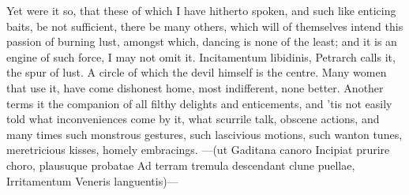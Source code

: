 Yet were it so, that these of which I have hitherto spoken, and such
like enticing baits, be not sufficient, there be many others, which
will of themselves intend this passion of burning lust, amongst which,
dancing is none of the least; and it is an engine of such force, I may
not omit it. Incitamentum libidinis, Petrarch calls it, the spur of
lust. A  circle of which the devil himself is the centre.
Many women that use it, have come dishonest home, most
indifferent, none better.  Another terms it the companion of all
filthy delights and enticements, and 'tis not easily told what
inconveniences come by it, what scurrile talk, obscene actions, and
many times such monstrous gestures, such lascivious motions, such
wanton tunes, meretricious kisses, homely embracings.
---(ut Gaditana canoro
Incipiat prurire choro, plausuque probatae
Ad terram tremula descendant clune puellae,
Irritamentum Veneris languentis)---

